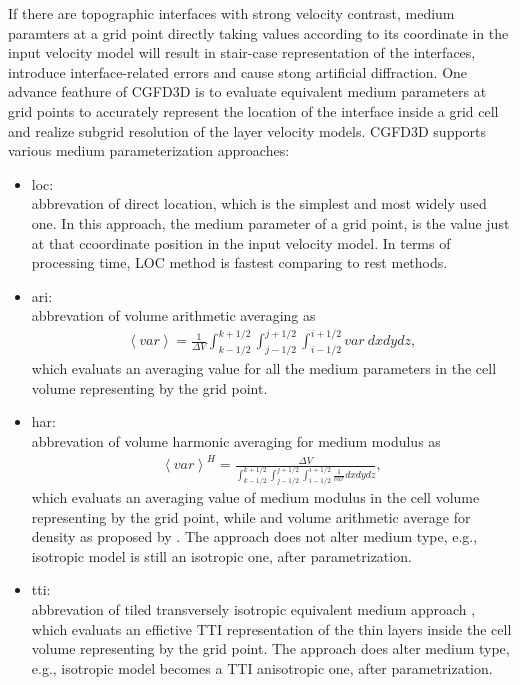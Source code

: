 If there are topographic interfaces with strong velocity contrast, 
medium paramters at a grid point directly taking values according to its coordinate in the input velocity model
 will result in stair-case representation of the interfaces, introduce interface-related errors and cause stong artificial diffraction.
One advance feathure of CGFD3D is to evaluate equivalent medium parameters at grid points 
to accurately represent the location of the interface inside a grid cell 
and realize subgrid resolution of the layer velocity models.
CGFD3D supports various medium parameterization approaches:
\begin{itemize}
\item loc: \\
  abbrevation of direct location, which is the simplest and most widely used one. 
      In this approach, the medium parameter of a grid point,
      is the value just at that ccoordinate position
      in the input velocity model. In terms of processing time,
      LOC method is fastest comparing to rest methods.
\item ari: \\
  abbrevation of volume arithmetic averaging as
  \begin{align}
    \left<var\right> = \frac{1}{\Delta V} 
            \int_{k-1/2}^{k+1/2} \int_{j-1/2}^{j+1/2} \int_{i-1/2}^{i+1/2} var~dx dy dz,
  \end{align}
  which evaluats an averaging value for all the medium parameters
    in the cell volume representing by the grid point.
\item har: \\
  abbrevation of volume harmonic averaging for medium modulus as 
  \begin{align}
    \left<var\right>^H = \frac{\Delta V}
      {\int_{k-1/2}^{k+1/2} \int_{j-1/2}^{j+1/2} \int_{i-1/2}^{i+1/2} \frac{1}{var} dx dy dz},
  \end{align}
  which evaluats an averaging value of medium modulus in the cell volume representing by the grid point,
  while and volume arithmetic average for density as proposed by \citet{moczo_3d_2002,moczo_finite-difference_2014}.
  The approach does not alter medium type,
    e.g., isotropic model is still an isotropic one, after parametrization.
\item tti: \\
  abbrevation of tiled transversely isotropic equivalent medium approach \citep{jiang2021tti}, 
        which evaluats an effictive TTI representation of the thin layers inside the cell volume representing by the grid point.
        The approach does alter medium type, e.g., isotropic model becomes a TTI anisotropic one, after parametrization.
\end{itemize}


